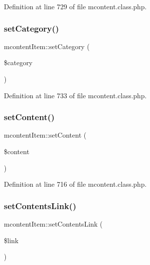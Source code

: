 Definition at line 729 of file mcontent.\+class.\+php.

\mbox{\label{classmcontentItem_a004c63ef8da549d29d201b4946372c5e}} 
\subsubsection{\texorpdfstring{set\+Category()}{setCategory()}}
{\footnotesize\ttfamily mcontent\+Item\+::set\+Category (\begin{DoxyParamCaption}\item[{}]{\$category }\end{DoxyParamCaption})}



Definition at line 733 of file mcontent.\+class.\+php.

\mbox{\label{classmcontentItem_afb9763a013942bd40ab5a3b1c7491910}} 
\subsubsection{\texorpdfstring{set\+Content()}{setContent()}}
{\footnotesize\ttfamily mcontent\+Item\+::set\+Content (\begin{DoxyParamCaption}\item[{}]{\$content }\end{DoxyParamCaption})}



Definition at line 716 of file mcontent.\+class.\+php.

\mbox{\label{classmcontentItem_a8d8267fc8c63ad032d8dfa694b54d30b}} 
\subsubsection{\texorpdfstring{set\+Contents\+Link()}{setContentsLink()}}
{\footnotesize\ttfamily mcontent\+Item\+::set\+Contents\+Link (\begin{DoxyParamCaption}\item[{}]{\$link }\end{DoxyParamCaption})}



